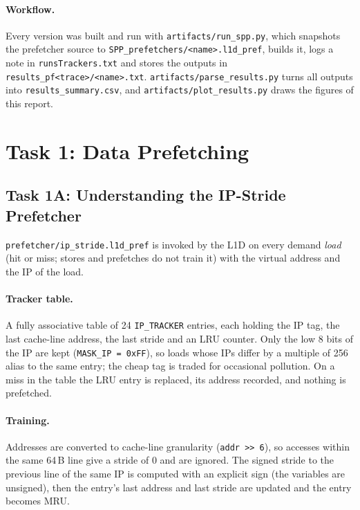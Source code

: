\documentclass[12pt, a4paper]{article}
\begin{document}
\paragraph{Workflow.} Every version was built and run with
\texttt{artifacts/run\_spp.py}, which snapshots the prefetcher source to
\texttt{SPP\_prefetchers/<name>.l1d\_pref}, builds it, logs a note in
\texttt{runsTrackers.txt} and stores the outputs in
\texttt{results\_pf<trace>/<name>.txt}. \texttt{artifacts/parse\_results.py}
turns all outputs into \texttt{results\_summary.csv}, and
\texttt{artifacts/plot\_results.py} draws the figures of this report.

\section{Task 1: Data Prefetching}\label{sec:task1}

\subsection{Task 1A: Understanding the IP-Stride Prefetcher}\label{sec:task1a}
\texttt{prefetcher/ip\_stride.l1d\_pref} is invoked by the L1D on every demand
\emph{load} (hit or miss; stores and prefetches do not train it) with the
virtual address and the IP of the load.

\paragraph{Tracker table.} A fully associative table of 24 \texttt{IP\_TRACKER}
entries, each holding the IP tag, the last cache-line address, the last stride
and an LRU counter. Only the low 8 bits of the IP are kept
(\texttt{MASK\_IP = 0xFF}), so loads whose IPs differ by a multiple of 256
alias to the same entry; the cheap tag is traded for occasional pollution. On a
miss in the table the LRU entry is replaced, its address recorded, and nothing
is prefetched.

\paragraph{Training.} Addresses are converted to cache-line granularity
(\texttt{addr >> 6}), so accesses within the same 64\,B line give a stride of 0
and are ignored. The signed stride to the previous line of the same IP is
computed with an explicit sign (the variables are unsigned), then the entry's
last address and last stride are updated and the entry becomes MRU.
\end{document}
